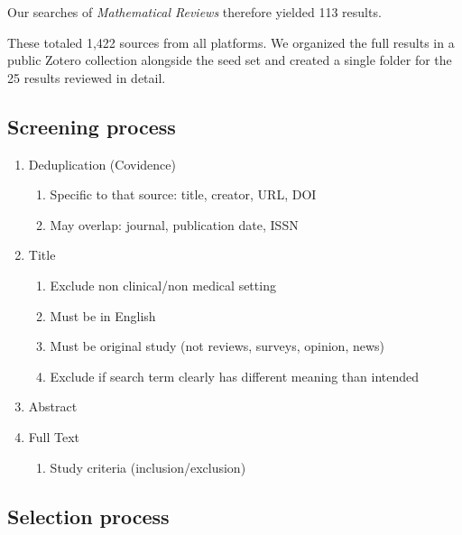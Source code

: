 \documentclass[preprint, 3p,
authoryear]{elsarticle} %
\providecommand{\tightlist}{%
  \setlength{\itemsep}{0pt}\setlength{\parskip}{0pt}}
\begin{document}
Our searches of \emph{Mathematical Reviews} therefore yielded 113
results.

These totaled 1,422 sources from all platforms. We organized the full
results in a public Zotero collection alongside the seed set and created
a single folder for the 25 results reviewed in detail.

\hypertarget{screening-process}{%
\subsection{Screening process}\label{screening-process}}

\label{sec:appendix-screening}

\begin{enumerate}
\def\labelenumi{\arabic{enumi}.}
\tightlist
\item
  Deduplication (Covidence)

  \begin{enumerate}
  \def\labelenumii{\alph{enumii}.}
  \tightlist
  \item
    Specific to that source: title, creator, URL, DOI
  \item
    May overlap: journal, publication date, ISSN
  \end{enumerate}
\item
  Title

  \begin{enumerate}
  \def\labelenumii{\alph{enumii}.}
  \tightlist
  \item
    Exclude non clinical/non medical setting
  \item
    Must be in English
  \item
    Must be original study (not reviews, surveys, opinion, news)
  \item
    Exclude if search term clearly has different meaning than intended
  \end{enumerate}
\item
  Abstract
\item
  Full Text

  \begin{enumerate}
  \def\labelenumii{\alph{enumii}.}
  \tightlist
  \item
    Study criteria (inclusion/exclusion)
  \end{enumerate}
\end{enumerate}

\hypertarget{selection-process}{%
\subsection{Selection process}\label{selection-process}}
\end{document}
